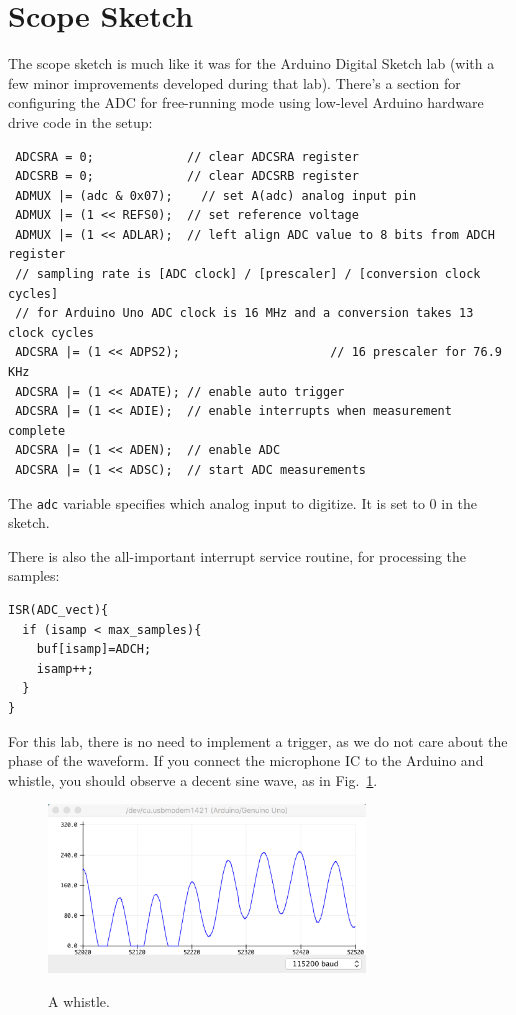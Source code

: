 \documentclass[12pt]{article}
\begin{document}
\section{Scope Sketch}

The scope sketch is much like it was for the Arduino Digital Sketch lab (with a few minor improvements developed during that lab).  There's a section for configuring the ADC for free-running mode using low-level Arduino hardware drive code in the setup: 
\begin{verbatim}
 ADCSRA = 0;             // clear ADCSRA register
 ADCSRB = 0;             // clear ADCSRB register
 ADMUX |= (adc & 0x07);    // set A(adc) analog input pin
 ADMUX |= (1 << REFS0);  // set reference voltage
 ADMUX |= (1 << ADLAR);  // left align ADC value to 8 bits from ADCH register
 // sampling rate is [ADC clock] / [prescaler] / [conversion clock cycles]
 // for Arduino Uno ADC clock is 16 MHz and a conversion takes 13 clock cycles
 ADCSRA |= (1 << ADPS2);                     // 16 prescaler for 76.9 KHz
 ADCSRA |= (1 << ADATE); // enable auto trigger
 ADCSRA |= (1 << ADIE);  // enable interrupts when measurement complete
 ADCSRA |= (1 << ADEN);  // enable ADC
 ADCSRA |= (1 << ADSC);  // start ADC measurements
\end{verbatim}
The {\tt adc} variable specifies which analog input to digitize.  It is set to 0 in the sketch.

There is also the all-important interrupt service routine, for processing the samples:
\begin{verbatim}
ISR(ADC_vect){
  if (isamp < max_samples){
    buf[isamp]=ADCH;
    isamp++;      
  }
}    
\end{verbatim}
For this lab, there is no need to implement a trigger, as we do not care about the phase of the waveform.
If you connect the microphone IC to the Arduino and whistle, you should observe a decent sine wave, as in Fig.~\ref{fig:whistle}.

\begin{figure}[htbp]
\begin{center}
{\includegraphics[width=0.75\textwidth]{figs/whistle.png}}
\end{center}
\caption{\label{fig:whistle} A whistle.}
\end{figure}
\end{document}
